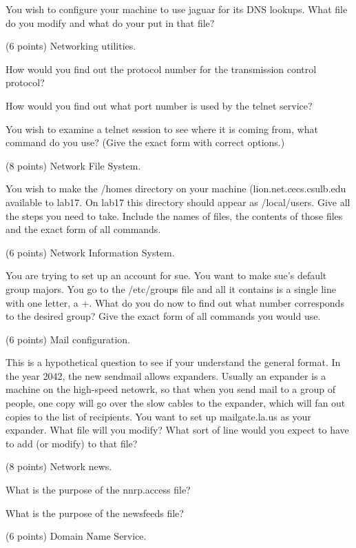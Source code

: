 You wish to configure your machine to use jaguar for its DNS lookups.
What file do you modify and what do your put in that file?
\vfill\eject

\ques
(6 points)
Networking utilities.

How would you find out the protocol number for the transmission control
protocol?
\vskip 0.8in

How would you find out what port number is used by the telnet service?
\vskip 0.8in

You wish to examine a telnet session to see where it is coming from,
what command do you use? (Give the exact form with correct options.)
\vskip 0.8in

\ques
(8 points)
Network File System.

You wish to make the {\ltt{}/homes} directory on your machine
({\ltt{}lion.net.cecs.csulb.edu} available to {\ltt{}lab17}.
On {\ltt{}lab17} this directory should appear as {\ltt{}/local/users}.
Give all the steps you need to take. 
Include the names of files, the contents of those files and
the exact form of all commands.
\vskip 3in

\ques
(6 points)
Network Information System.

You are trying to set up an account for sue.
You want to make sue's default group {\ltt{}majors}.
You go to the {\ltt{}/etc/groups} file and all it
contains is a single line with one letter, a {\ltt{}+}.
What do you do now to find out what number corresponds
to the desired group?
Give the exact form of all commands you would use.
\vfill\eject

\ques
(6 points)
Mail configuration.

This is a hypothetical question to see if your understand the general format.
In the year 2042, the new sendmail allows expanders. 
Usually an expander is a machine on the high-speed netowrk, so that
when you send mail to a group of people, one copy will go over the
slow cables to the expander, which will fan out copies to the list
of recipients.
You want to set up {\ltt{}mailgate.la.us} as your expander.
What file will you modify?
What sort of line would you expect to have to add (or modify) to that file?
\vskip 1in

\ques
(8 points)
Network news.

What is the purpose of the nnrp.access file?
\vskip 0.8in

What is the purpose of the newsfeeds file?
\vskip 0.8in

\ques
(6 points)
Domain Name Service.

